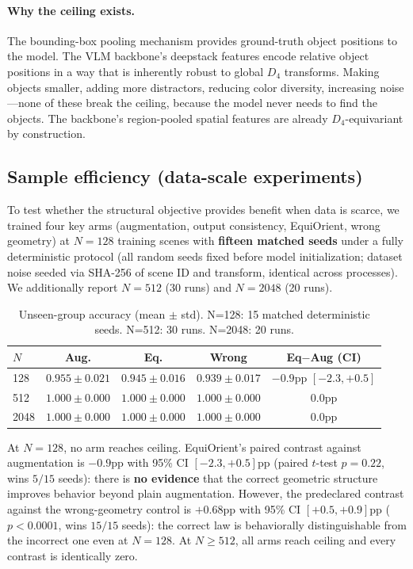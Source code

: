 \documentclass[10pt,twocolumn,letterpaper]{article}
\begin{document}
\paragraph{Why the ceiling exists.}
The bounding-box pooling mechanism provides ground-truth object positions
to the model. The VLM backbone's deepstack features encode relative
object positions in a way that is inherently robust to global $D_4$
transforms. Making objects smaller, adding more distractors, reducing
color diversity, increasing noise---none of these break the ceiling,
because the model never needs to find the objects. The backbone's
region-pooled spatial features are already $D_4$-equivariant by
construction.

\subsection{Sample efficiency (data-scale experiments)}

To test whether the structural objective provides benefit when data is
scarce, we trained four key arms (augmentation, output consistency,
EquiOrient, wrong geometry) at $N=128$ training scenes with
\textbf{fifteen matched seeds} under a fully deterministic protocol (all
random seeds fixed before model initialization; dataset noise seeded
via SHA-256 of scene ID and transform, identical across processes).
We additionally report $N=512$ (30 runs) and $N=2048$ (20 runs).

\begin{table}[t]
\centering\small
\begin{tabular}{lcccc}
\toprule
$N$ & Aug. & Eq. & Wrong & Eq$-$Aug (CI) \\
\midrule
128 & $0.955 \pm 0.021$ & $0.945 \pm 0.016$ & $0.939 \pm 0.017$ & $-0.9$pp $[-2.3, +0.5]$ \\
512 & $1.000 \pm 0.000$ & $1.000 \pm 0.000$ & $1.000 \pm 0.000$ & $0.0$pp \\
2048 & $1.000 \pm 0.000$ & $1.000 \pm 0.000$ & $1.000 \pm 0.000$ & $0.0$pp \\
\bottomrule
\end{tabular}
\caption{Unseen-group accuracy (mean $\pm$ std). N=128: 15 matched
deterministic seeds. N=512: 30 runs. N=2048: 20 runs.}
\label{tab:scaling}
\end{table}

At $N{=}128$, no arm reaches ceiling. EquiOrient's paired contrast
against augmentation is $-0.9$pp with 95\% CI $[-2.3, +0.5]$pp
(paired $t$-test $p=0.22$, wins $5/15$ seeds): there is
\textbf{no evidence} that the correct geometric structure improves
behavior beyond plain augmentation. However, the predeclared contrast
against the wrong-geometry control is $+0.68$pp with 95\% CI
$[+0.5, +0.9]$pp ($p<0.0001$, wins $15/15$ seeds): the correct law
is behaviorally distinguishable from the incorrect one even at
$N{=}128$. At $N \geq 512$, all arms reach ceiling and every contrast
is identically zero.
\end{document}
